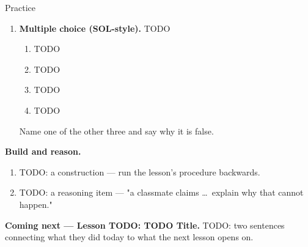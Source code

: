 \documentclass[10pt]{article}
\begin{document}
\begin{notesbox}{Practice}
\begin{enumerate}[leftmargin=1.9em, itemsep=11pt]
  \item \textbf{Multiple choice (SOL-style).} TODO
    \begin{enumerate}[label=(\Alph*), leftmargin=2.0em, itemsep=1pt]
      \item TODO
      \item TODO
      \item TODO
      \item TODO
    \end{enumerate}
    Name one of the other three and say why it is false. 
\end{enumerate}
\end{notesbox}

\boxguard[18]
\begin{extensionbox}
\textbf{Build and reason.}
\begin{enumerate}[label=(\alph*), leftmargin=1.9em, itemsep=6pt]
  \item TODO: a construction --- run the lesson's procedure backwards.
        \begin{work}
        \end{work}
  \item TODO: a reasoning item --- "a classmate claims \dots\ explain why that cannot happen."
\end{enumerate}
\end{extensionbox}

\begin{spiralbox}
\textbf{Coming next --- Lesson TODO: TODO Title.} TODO: two sentences connecting what they did
today to what the next lesson opens on.
\end{spiralbox}
\end{document}
